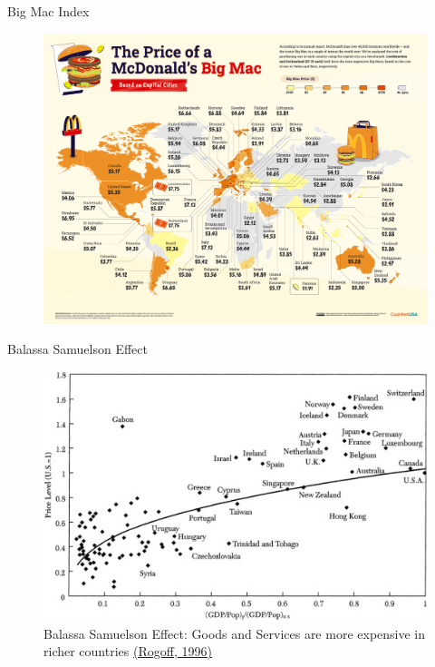 \documentclass[notes,11pt, aspectratio=169, xcolor=table]{beamer}
\begin{document}
\begin{frame}{Big Mac Index}
    \begin{figure}
        \centering
        \includegraphics[width=0.65\linewidth]{figs/01_The-Price-of-McDonalds-Big-Mac_World-Map.png}
    \end{figure}
\end{frame}


\begin{frame}{Balassa Samuelson Effect}
    \begin{figure}
        \centering
        \includegraphics[width=0.65\linewidth]{figs/balassa-samuelson.jpg}
        \caption{Balassa Samuelson Effect: Goods and Services are more expensive in richer countries \href{https://scholar.harvard.edu/files/rogoff/files/51_jel1996.pdf}{(Rogoff, 1996)}}
    \end{figure}
\end{frame}
\end{document}
